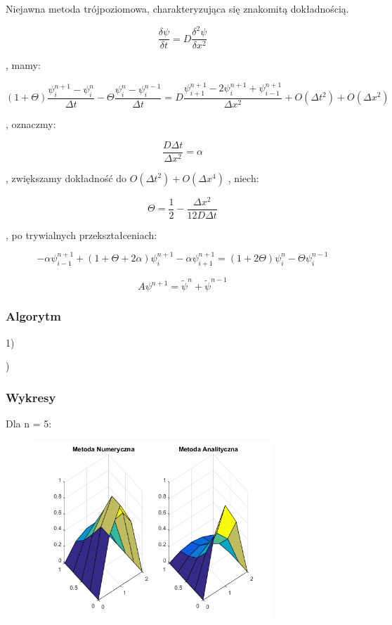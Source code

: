 Niejawna metoda trójpoziomowa, charakteryzująca się znakomitą dokładnością.

$$\dfrac{\delta \psi}{\delta t} = D\dfrac{\delta^2 \psi}{\delta x^2}$$

, mamy:

$$(1+\Theta)\dfrac{\psi^{n+1}_{i}-\psi^n_{i}}{\Delta t}-\Theta\dfrac{\psi^{n}_{i}-\psi^{n-1}_{i}}{\Delta t} = D \dfrac{\psi^{n+1}_{i+1}-2\psi^{n+1}_{i}+\psi^{n+1}_{i-1}}{\Delta x^2} + O(\Delta t^2) + O(\Delta x^2) $$

, oznaczmy:

$$\dfrac{D\Delta t}{\Delta x^2} = \alpha$$

, zwiększamy dokładność do  $O(\Delta t^2) + O(\Delta x^4)$ , niech:

$$\Theta = \frac{1}{2} - \dfrac{\Delta x^2}{12D\Delta t}$$

, po trywialnych przekształceniach:

$$-\alpha\psi^{n+1}_{i-1}+(1+\Theta + 2\alpha)\psi^{n+1}_{i}-\alpha\psi^{n+1}_{i+1}=(1+2\Theta)\psi^{n}_{i} - \Theta\psi^{n-1}_{i}$$

$$A\psi^{n+1}=\widetilde{\psi}^{n}+\widetilde{\psi}^{n-1}$$


\subsubsection{Algorytm}
1)

)

\newpage
\subsubsection{Wykresy}

Dla n = 5:

\begin{figure}[!ht]
	\begin{center}
		\includegraphics[width=0.8\textwidth]{Lab7/charts/rm/5.png}
	\end{center}
\end{figure}

